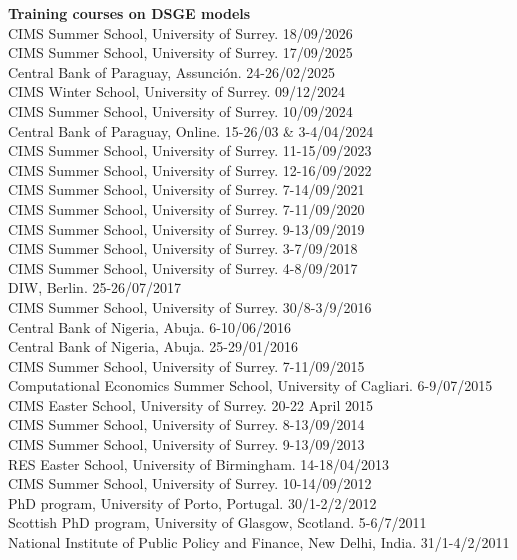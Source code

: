 \documentclass[margin, 11pt]{res} %
\begin{document}
\begin{resume}
\textbf{Training courses on DSGE models}\\
CIMS Summer School, University of Surrey. \hfill 18/09/2026 \\
CIMS Summer School, University of Surrey. \hfill 17/09/2025 \\
Central Bank of Paraguay, Assunción. \hfill 24-26/02/2025 \\
CIMS Winter School, University of Surrey. \hfill 09/12/2024 \\
CIMS Summer School, University of Surrey. \hfill 10/09/2024 \\
Central Bank of Paraguay, Online. \hfill 15-26/03 \& 3-4/04/2024 \\
CIMS Summer School, University of Surrey. \hfill 11-15/09/2023 \\
CIMS Summer School, University of Surrey. \hfill 12-16/09/2022 \\
CIMS Summer School, University of Surrey. \hfill 7-14/09/2021 \\
CIMS Summer School, University of Surrey. \hfill 7-11/09/2020 \\
CIMS Summer School, University of Surrey. \hfill 9-13/09/2019 \\
CIMS Summer School, University of Surrey. \hfill 3-7/09/2018 \\
CIMS Summer School, University of Surrey. \hfill 4-8/09/2017\\
DIW, Berlin. \hfill 25-26/07/2017 \\
CIMS Summer School, University of Surrey. \hfill 30/8-3/9/2016\\
Central Bank of Nigeria, Abuja. \hfill 6-10/06/2016 \\
Central Bank of Nigeria, Abuja. \hfill 25-29/01/2016\\
CIMS Summer School, University of Surrey. \hfill 7-11/09/2015\\
Computational Economics Summer School, University of Cagliari. \hfill 6-9/07/2015\\
CIMS Easter School, University of Surrey. \hfill 20-22 April 2015\\
CIMS Summer School, University of Surrey. \hfill 8-13/09/2014\\
CIMS Summer School, University of Surrey. \hfill 9-13/09/2013\\
RES Easter School, University of Birmingham. \hfill 14-18/04/2013\\
CIMS Summer School, University of Surrey. \hfill 10-14/09/2012 \\
PhD program, University of Porto, Portugal. \hfill 30/1-2/2/2012\\
Scottish PhD program, University of Glasgow, Scotland. \hfill 5-6/7/2011\\
National Institute of Public Policy and Finance, New Delhi, India. \hfill 31/1-4/2/2011


\end{resume}
\end{document}
